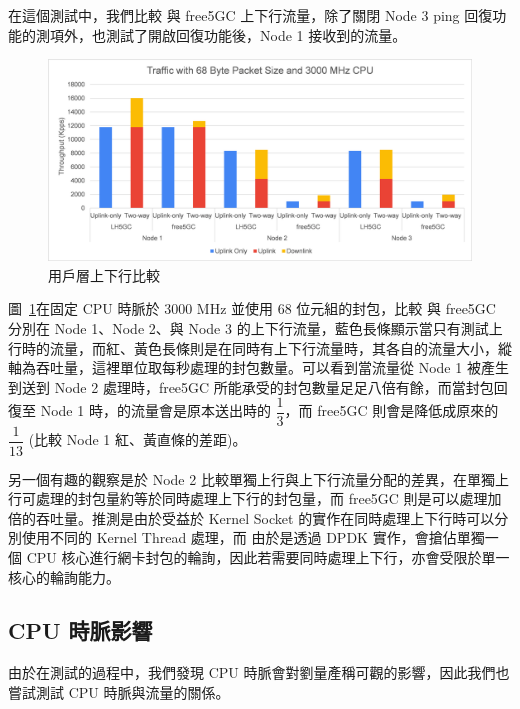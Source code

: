 在這個測試中，我們比較 \LHCN 與 free5GC 上下行流量，除了關閉 Node 3 ping 回復功能的測項外，也測試了開啟回復功能後，Node 1 接收到的流量。

\begin{figure}[htb]
    \centering
    \includegraphics[height=!,width=1\linewidth,keepaspectratio=true]{figures/up_uldl_comp}
    \caption[用戶層上下行比較]{{\footnotesize 用戶層上下行比較}}
    \label{fig:up_uldl_comp}
\end{figure}

圖~\ref{fig:up_uldl_comp}在固定 CPU 時脈於 3000 MHz 並使用 68 位元組的封包，比較 \LHCN 與 free5GC 分別在 Node 1、Node 2、與 Node 3 的上下行流量，藍色長條顯示當只有測試上行時的流量，而紅、黃色長條則是在同時有上下行流量時，其各自的流量大小，縱軸為吞吐量，這裡單位取每秒處理的封包數量。可以看到當流量從 Node 1 被產生到送到 Node 2 處理時，free5GC 所能承受的封包數量足足八倍有餘，而當封包回復至 Node 1 時，\LHCN 的流量會是原本送出時的 $\dfrac{1}{3}$，而 free5GC 則會是降低成原來的 $\dfrac{1}{13}$ (比較 Node 1 紅、黃直條的差距)。

另一個有趣的觀察是於 Node 2 比較單獨上行與上下行流量分配的差異，\LHCN 在單獨上行可處理的封包量約等於同時處理上下行的封包量，而 free5GC 則是可以處理加倍的吞吐量。推測是由於受益於 Kernel Socket 的實作在同時處理上下行時可以分別使用不同的 Kernel Thread 處理，而 \LHCN 由於是透過 DPDK 實作，會搶佔單獨一個 CPU 核心進行網卡封包的輪詢，因此若需要同時處理上下行，亦會受限於單一核心的輪詢能力。

\subsection{CPU 時脈影響}
\label{subsec:cpu_clock}

由於在測試的過程中，我們發現 CPU 時脈會對劉量產稱可觀的影響，因此我們也嘗試測試 CPU 時脈與流量的關係。

